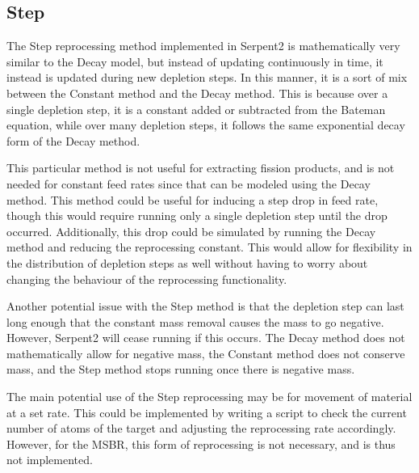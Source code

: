 


\subsection{Step}

The Step reprocessing method implemented in Serpent2 is mathematically very similar to the Decay model, but instead of updating continuously in time, it instead is updated during new depletion steps. In this manner, it is a sort of mix between the Constant method and the Decay method. This is because over a single depletion step, it is a constant added or subtracted from the Bateman equation, while over many depletion steps, it follows the same exponential decay form of the Decay method.

This particular method is not useful for extracting fission products, and is not needed for constant feed rates since that can be modeled using the Decay method. This method could be useful for inducing a step drop in feed rate, though this would require running only a single depletion step until the drop occurred. Additionally, this drop could be simulated by running the Decay method and reducing the reprocessing constant. This would allow for flexibility in the distribution of depletion steps as well without having to worry about changing the behaviour of the reprocessing functionality. 

Another potential issue with the Step method is that the depletion step can last long enough that the constant mass removal causes the mass to go negative. However, Serpent2 will cease running if this occurs. The Decay method does not mathematically allow for negative mass, the Constant method does not conserve mass, and the Step method stops running once there is negative mass.

The main potential use of the Step reprocessing may be for movement of material at a set rate. This could be implemented by writing a script to check the current number of atoms of the target and adjusting the reprocessing rate accordingly. However, for the MSBR, this form of reprocessing is not necessary, and is thus not implemented.

